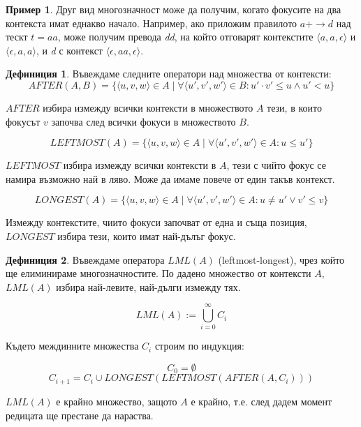 \documentclass[12pt, oneside]{article}
\theoremstyle{definition}
\newtheorem{definition}{Дефиниция}[section]
\newtheorem{example}{Пример}[section]
\begin{document}
\begin{example}
	Друг вид многозначност може да получим, когато фокусите на два контекста имат еднакво начало. Например, ако приложим правилото \(a+ \to d \) над тескт \( t = aa \), може получим превода \emph{dd}, на който отговарят контекстите \( \langle a, a, \epsilon \rangle \) и \( \langle \epsilon, a, a \rangle \), и \emph{d} с контекст \( \langle \epsilon, aa, \epsilon \rangle \).
\end{example}
\begin{definition}\label{def:LmlOps}
	Въвеждаме следните оператори над множества от контексти:
\[ AFTER(A, B) = \{ \langle u, v, w \rangle \in A \mid \forall \langle u', v', w' \rangle \in B : u' \cdot v' \leq u \land u' < u  \} \] 

\( AFTER \) избира измежду всички контексти в множеството \(A\) тези, в които фокусът \(v\) започва след всички фокуси в множеството \(B\).

\[ LEFTMOST(A) = \{ \langle u, v, w \rangle \in A \mid \forall \langle u', v', w' \rangle \in A : u \leq u' \} \]

\( LEFTMOST \) избира измежду всички контексти в \(A\), тези с чийто фокус се намира възможно най в ляво. Може да имаме повече от един такъв контекст.

\[ LONGEST(A) = \{ \langle u, v, w \rangle \in A \mid \forall \langle u', v', w' \rangle \in A : u \neq u' \lor v' \leq v \} \]

Измежду контекстите, чиито фокуси започват от една и съща позиция, \( LONGEST \) избира тези, които имат най-дълъг фокус.
\end{definition}

\begin{definition}
	Въвеждаме оператора \( LML(A) \) (leftmost-longest), чрез който ще елиминираме многозначностите. По дадено множество от контексти \(A\), \( LML(A) \) избира най-левите, най-дълги измежду тях.

	\[ LML(A) := \bigcup\limits_{i=0}^{\infty} C_{i} \]

	Където междинните множества \( C_i \) строим по индукция:

	\[ C_0 = \emptyset \]
	\[ C_{i+1} = C_i \cup LONGEST(LEFTMOST(AFTER(A, C_i))) \]

	\noindent \( LML(A) \) е крайно множество, защото \( A \) е крайно, т.е. след дадем момент редицата ще престане да нараства.
\end{definition}
\end{document}
